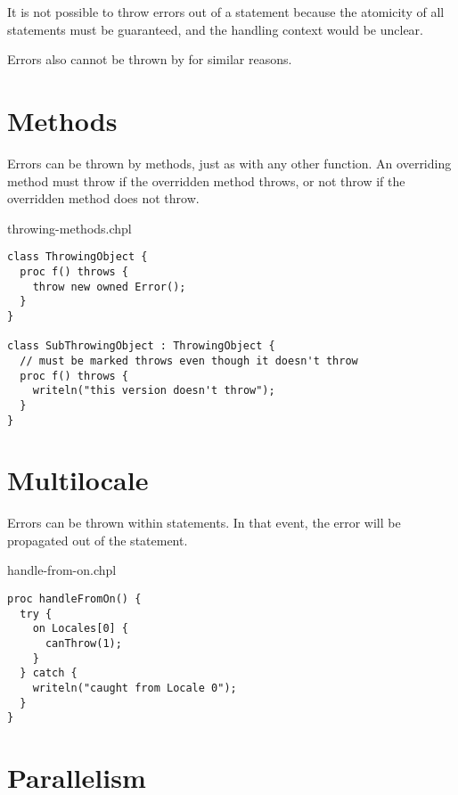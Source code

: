 It is not possible to throw errors out of a  statement because the
atomicity of all  statements must be guaranteed, and the handling
context would be unclear.

Errors also cannot be thrown by  for similar reasons.


\section{Methods}
\label{Errors_Methods}

Errors can be thrown by methods, just as with any other function.
An overriding method must throw if the overridden method throws,
or not throw if the overridden method does not throw.

\begin{chapelexample}{throwing-methods.chpl}
\begin{chapel}
\begin{verbatim}
class ThrowingObject {
  proc f() throws {
    throw new owned Error();
  }
}

class SubThrowingObject : ThrowingObject {
  // must be marked throws even though it doesn't throw
  proc f() throws {
    writeln("this version doesn't throw");
  }
}
\end{verbatim}
\end{chapel}
\end{chapelexample}


\section{Multilocale}
\label{Errors_Multilocale}

Errors can be thrown within  statements. In that event, the error
will be propagated out of the  statement.

\begin{chapelexample}{handle-from-on.chpl}
\begin{chapel}
\begin{verbatim}
proc handleFromOn() {
  try {
    on Locales[0] {
      canThrow(1);
    }
  } catch {
    writeln("caught from Locale 0");
  }
}
\end{verbatim}
\end{chapel}
\end{chapelexample}


\section{Parallelism}
\label{Errors_Parallelism}


